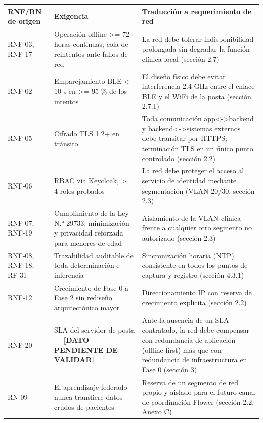 \documentclass[11pt,a4paper]{article}
\begin{document}
{\small
\begin{longtable}[]{@{}
  >{\raggedright\arraybackslash}p{}
  >{\raggedright\arraybackslash}p{}
  >{\raggedright\arraybackslash}p{}@{}}
\toprule\noalign{}
\begin{minipage}[b]{\linewidth}\raggedright
RNF/RN de origen
\end{minipage} & \begin{minipage}[b]{\linewidth}\raggedright
Exigencia
\end{minipage} & \begin{minipage}[b]{\linewidth}\raggedright
Traducción a requerimiento de red
\end{minipage} \\
\midrule\noalign{}
\endhead
\bottomrule\noalign{}
\endlastfoot
RNF-03, RNF-17 & Operación offline \textgreater= 72 horas continuas; cola de reintentos ante fallos de red & La red debe tolerar indisponibilidad prolongada sin degradar la función clínica local (sección 2.7) \\
RNF-02 & Emparejamiento BLE \textless{} 10 s en \textgreater= 95 \% de los intentos & El diseño físico debe evitar interferencia 2.4 GHz entre el enlace BLE y el WiFi de la posta (sección 2.7.1) \\
RNF-05 & Cifrado TLS 1.2+ en tránsito & Toda comunicación app\textless-\textgreater backend y backend\textless-\textgreater sistemas externos debe transitar por HTTPS; terminación TLS en un único punto controlado (sección 2.2) \\
RNF-06 & RBAC vía Keycloak, \textgreater= 4 roles probados & La red debe proteger el acceso al servicio de identidad mediante segmentación (VLAN 20/30, sección 2.3) \\
RNF-07, RNF-19 & Cumplimiento de la Ley N.° 29733; minimización y privacidad reforzada para menores de edad & Aislamiento de la VLAN clínica frente a cualquier otro segmento no autorizado (sección 2.3) \\
RNF-08, RNF-18, RF-31 & Trazabilidad auditable de toda determinación e inferencia & Sincronización horaria (NTP) consistente en todos los puntos de captura y registro (sección 4.3.1) \\
RNF-12 & Crecimiento de Fase 0 a Fase 2 sin rediseño arquitectónico mayor & Direccionamiento IP con reserva de crecimiento explícita (sección 2.2) \\
RNF-20 & SLA del servidor de posta --- \textbf{{[}DATO PENDIENTE DE VALIDAR{]}} & Ante la ausencia de un SLA contratado, la red debe compensar con redundancia de aplicación (offline-first) más que con redundancia de infraestructura en Fase 0 (sección 3) \\
RN-09 & El aprendizaje federado nunca transfiere datos crudos de pacientes & Reserva de un segmento de red propio y aislado para el futuro canal de coordinación Flower (sección 2.2, Anexo C) \\
\end{longtable}
}
\end{document}
